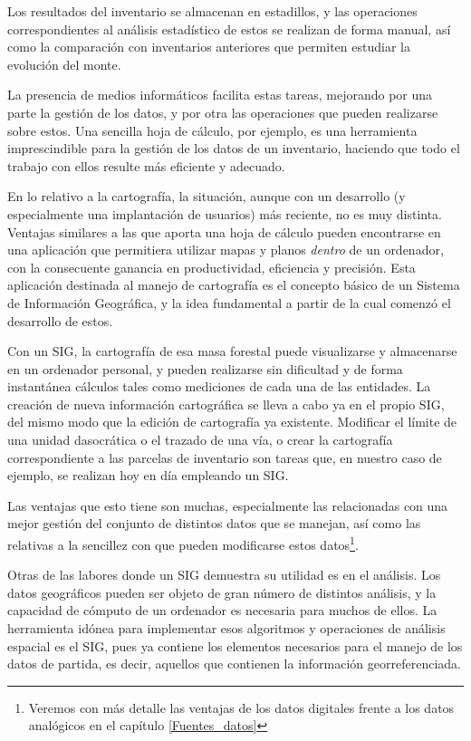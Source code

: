 Los resultados del inventario se almacenan en estadillos, y las operaciones correspondientes al análisis estadístico de estos se realizan de forma manual, así como la comparación con inventarios anteriores que permiten estudiar la evolución del monte.

La presencia de medios informáticos facilita estas tareas, mejorando por una parte la gestión de los datos, y por otra las operaciones que pueden realizarse sobre estos. Una sencilla hoja de cálculo, por ejemplo, es una herramienta imprescindible para la gestión de los datos de un inventario, haciendo que todo el trabajo con ellos resulte más eficiente y adecuado.

En lo relativo a la cartografía, la situación, aunque con un desarrollo (y especialmente una implantación de usuarios) más reciente, no es muy distinta. Ventajas similares a las que aporta una hoja de cálculo pueden encontrarse en una aplicación que permitiera utilizar mapas y planos \emph{dentro} de un ordenador, con la consecuente ganancia en productividad, eficiencia y precisión. Esta aplicación destinada al manejo de cartografía es el concepto básico de un Sistema de Información Geográfica, y la idea fundamental a partir de la cual comenzó el desarrollo de estos.

Con un SIG, la cartografía de esa masa forestal puede visualizarse y almacenarse en un ordenador personal, y pueden realizarse sin dificultad y de forma instantánea cálculos tales como mediciones de cada una de las entidades. La creación de nueva información cartográfica se lleva a cabo ya en el propio SIG, del mismo modo que la edición de cartografía ya existente. Modificar el límite de una unidad dasocrática o el trazado de una vía, o crear la cartografía correspondiente a las parcelas de inventario son tareas que, en nuestro caso de ejemplo, se realizan hoy en día empleando un SIG.

Las ventajas que esto tiene son muchas, especialmente las relacionadas con una mejor gestión del conjunto de distintos datos que se manejan, así como las relativas a la sencillez con que pueden modificarse estos datos\footnote{Veremos con más detalle las ventajas de los datos digitales frente a los datos analógicos en el capítulo \ref{Fuentes_datos}}.

Otras de las labores donde un SIG demuestra su utilidad es en el análisis. Los datos geográficos pueden ser objeto de gran número de distintos análisis, y la capacidad de cómputo de un ordenador es necesaria para muchos de ellos. La herramienta idónea para implementar esos algoritmos y operaciones de análisis espacial es el SIG, pues ya contiene los elementos necesarios para el manejo de los datos de partida, es decir, aquellos que contienen la información georreferenciada.

